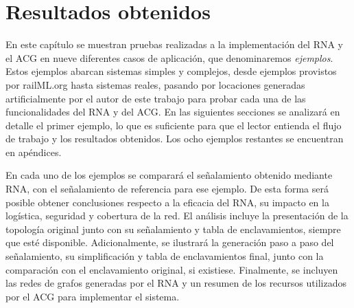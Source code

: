 \chapter{Resultados obtenidos}
	\label{sec:resultados}

	En este capítulo se muestran pruebas realizadas a la implementación del RNA y el ACG en nueve diferentes casos de aplicación, que denominaremos \textit{ejemplos}. Estos ejemplos abarcan sistemas simples y complejos, desde ejemplos provistos por railML.org hasta sistemas reales, pasando por locaciones generadas artificialmente por el autor de este trabajo para probar cada una de las funcionalidades del RNA y del ACG. En las siguientes secciones se analizará en detalle el primer ejemplo, lo que es suficiente para que el lector entienda el flujo de trabajo y los resultados obtenidos. Los ocho ejemplos restantes se encuentran en apéndices.
	
	En cada uno de los ejemplos se comparará el señalamiento obtenido mediante RNA, con el señalamiento de referencia para ese ejemplo. De esta forma será posible obtener conclusiones respecto a la eficacia del RNA, su impacto en la logística, seguridad y cobertura de la red. El análisis incluye la presentación de la topología original junto con su señalamiento y tabla de enclavamientos, siempre que esté disponible. Adicionalmente, se ilustrará la generación paso a paso del señalamiento, su simplificación y tabla de enclavamientos final, junto con la comparación con el enclavamiento original, si existiese. Finalmente, se incluyen las redes de grafos generadas por el RNA y un resumen de los recursos utilizados por el ACG para implementar el sistema.
	
	
	
	
	
	
	
